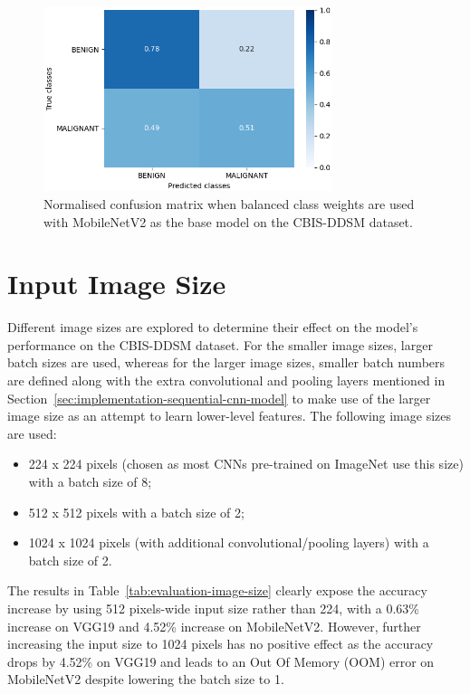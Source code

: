 \begin{figure}[h]
\centerline{\includegraphics[width=0.75\textwidth]{figures/evaluation/class_weights_experiment/balanced.png}}
\caption{\label{fig:evaluation-class_weights_experiment-balanced}Normalised confusion matrix when balanced class weights are used with MobileNetV2 as the base model on the CBIS-DDSM dataset.}
\end{figure}


\section{Input Image Size}
\label{sec:evaluation-input-image-size}

Different image sizes are explored to determine their effect on the model's performance on the CBIS-DDSM dataset. For the smaller image sizes, larger batch sizes are used, whereas for the larger image sizes, smaller batch numbers are defined along with the extra convolutional and pooling layers mentioned in Section~\ref{sec:implementation-sequential-cnn-model} to make use of the larger image size as an attempt to learn lower-level features. The following image sizes are used:
\begin{itemize}
    \item 224 x 224 pixels (chosen as most CNNs pre-trained on ImageNet use this size) with a batch size of 8;
    \item 512 x 512 pixels with a batch size of 2;
    \item 1024 x 1024 pixels (with additional convolutional/pooling layers) with a batch size of 2.
\end{itemize}



The results in Table~\ref{tab:evaluation-image-size} clearly expose the accuracy increase by using 512 pixels-wide input size rather than 224, with a 0.63\% increase on VGG19 and 4.52\% increase on MobileNetV2. However, further increasing the input size to 1024 pixels has no positive effect as the accuracy drops by 4.52\% on VGG19 and leads to an Out Of Memory (OOM) error on MobileNetV2 despite lowering the batch size to 1.\\

